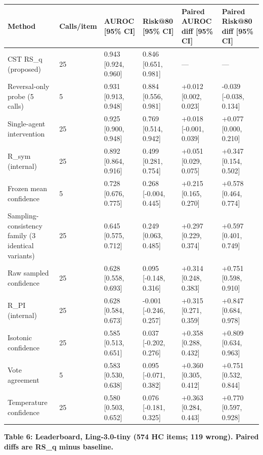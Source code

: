 \documentclass[11pt]{article}
\begin{document}
\begin{table}[t]
\centering
\small
\begin{tabular}{llllll}
\toprule
Method & Calls/item & AUROC [95\% CI] & Risk@80 [95\% CI] & Paired AUROC diff [95\% CI] & Paired Risk@80 diff [95\% CI] \\
\midrule
CST RS\_q (proposed) & 25 & 0.943 [0.924, 0.960] & 0.846 [0.651, 0.981] & — & — \\
Reversal-only probe (5 calls) & 5 & 0.931 [0.913, 0.948] & 0.884 [0.556, 0.981] & +0.012 [0.002, 0.023] & -0.039 [-0.038, 0.134] \\
Single-agent intervention & 25 & 0.925 [0.900, 0.948] & 0.769 [0.514, 0.942] & +0.018 [-0.001, 0.039] & +0.077 [0.000, 0.210] \\
R\_sym (internal) & 25 & 0.892 [0.864, 0.916] & 0.499 [0.281, 0.754] & +0.051 [0.029, 0.075] & +0.347 [0.154, 0.502] \\
Frozen mean confidence & 5 & 0.728 [0.676, 0.775] & 0.268 [-0.004, 0.445] & +0.215 [0.165, 0.270] & +0.578 [0.464, 0.774] \\
Sampling-consistency family (3 identical variants) & 25 & 0.645 [0.575, 0.712] & 0.249 [0.063, 0.485] & +0.297 [0.229, 0.374] & +0.597 [0.401, 0.749] \\
Raw sampled confidence & 25 & 0.628 [0.558, 0.693] & 0.095 [-0.148, 0.316] & +0.314 [0.248, 0.383] & +0.751 [0.598, 0.910] \\
R\_PI (internal) & 25 & 0.628 [0.584, 0.673] & -0.001 [-0.246, 0.257] & +0.315 [0.271, 0.359] & +0.847 [0.684, 0.978] \\
Isotonic confidence & 25 & 0.585 [0.513, 0.651] & 0.037 [-0.202, 0.276] & +0.358 [0.288, 0.432] & +0.809 [0.634, 0.963] \\
Vote agreement & 5 & 0.583 [0.530, 0.638] & 0.095 [-0.071, 0.382] & +0.360 [0.305, 0.412] & +0.751 [0.532, 0.844] \\
Temperature confidence & 25 & 0.580 [0.503, 0.652] & 0.076 [-0.181, 0.325] & +0.363 [0.284, 0.443] & +0.770 [0.597, 0.928] \\
\bottomrule
\end{tabular}
\end{table}


\textbf{Table 6: Leaderboard, Ling-3.0-tiny (574 HC items; 119 wrong). Paired diffs are RS\_q minus baseline.}
\end{document}
